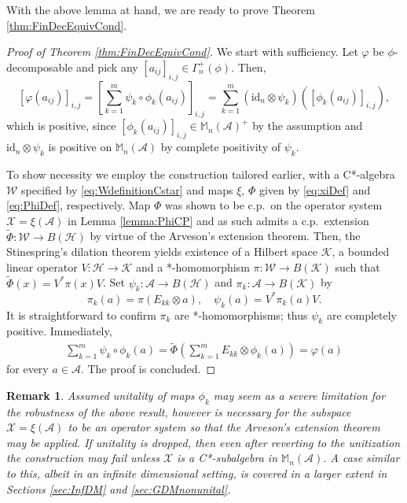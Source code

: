 \documentclass[reqno]{amsart}
\theoremstyle{plain}
\newtheorem{remark}{Remark}
\numberwithin{equation}{section}
\numberwithin{theorem}{section}
\numberwithin{lemma}{section}
\numberwithin{definition}{section}
\numberwithin{corollary}{section}
\numberwithin{remark}{section}
\newcommand{\id}[1]{\mathrm{id}_{#1}}
\newcommand{\hadj}{*}
\newcommand{\hilbert}{\mathcal{H}}
\newcommand{\matra}[2]{\mathbb{M}_{#1}(#2)}
\begin{document}
With the above lemma at hand, we are ready to prove Theorem \ref{thm:FinDecEquivCond}.

\begin{proof}[Proof of Theorem \ref{thm:FinDecEquivCond}]
We start with sufficiency. Let $\varphi$ be $\phi$-decomposable and pick any $\left[a_{ij}\right]_{i,j}\in\Gamma_{n}^{+}(\phi)$. Then,
%
\begin{equation}\label{eq:GenDecProofRight}
    \left[\varphi(a_{ij})\right]_{i,j} = \left[ \sum_{k=1}^{m} \psi_k \circ \phi_k \left(a_{ij}\right) \right]_{i,j} = \sum_{k=1}^{m} \left(\id{n}\otimes\psi_k\right)\left(\left[\phi_k (a_{ij})\right]_{i,j}\right),
\end{equation}
which is positive, since $\left[\phi_k (a_{ij})\right]_{i,j} \in \matra{n}{\mathscr{A}}^+$ by the assumption and $\id{n}\otimes\psi_k$ is positive on $\matra{n}{\mathscr{A}}$ by complete positivity of $\psi_k$.

To show necessity we employ the construction tailored earlier, with a C*-algebra $\mathscr{W}$ specified by \eqref{eq:WdefinitionCstar} and maps $\xi$, $\Phi$ given by \eqref{eq:xiDef} and \eqref{eq:PhiDef}, respectively. Map $\Phi$ was shown to be c.p.~on the operator system $\mathscr{X} = \xi(\mathscr{A})$ in Lemma \ref{lemma:PhiCP} and as such admits a c.p.~extension $\tilde{\Phi} : \mathscr{W}\to B(\hilbert)$ by virtue of the Arveson's extension theorem. Then, the Stinespring's dilation theorem \cite{Stinespring_1955} yields existence of a Hilbert space $\mathcal{K}$, a bounded linear operator $V : \hilbert\to\mathcal{K}$ and a *-homomorphism $\pi : \mathscr{W} \to B(\mathcal{K})$ such that $\tilde{\Phi}(x) = V^\hadj \pi (x) V$. Set $\psi_k : \mathscr{A}\to B(\hilbert)$ and $\pi_k : \mathscr{A}\to B(\mathcal{K})$ by
\begin{equation}\label{eq:piPsidef}
    \pi_k(a) = \pi (E_{kk}\otimes a), \quad \psi_k (a) = V^\hadj \pi_k (a) V.
\end{equation}
It is straightforward to confirm $\pi_k$ are *-homomorphisms; thus $\psi_k$ are completely positive. Immediately,
\begin{align}\label{eq:varphiSOTseries}
    \sum_{k=1}^{m} \psi_k \circ \phi_k(a) =  \tilde{\Phi}\left( \sum_{k=1}^{m}E_{kk}\otimes\phi_k(a)\right) = \varphi (a)
\end{align}
for every $a\in\mathscr{A}$. The proof is concluded.
\end{proof}

\begin{remark}
    Assumed unitality of maps $\phi_k$ may seem as a severe limitation for the robustness of the above result, however is necessary for the subspace $\mathscr{X} = \xi(\mathscr{A})$ to be an operator system so that the Arveson's extension theorem may be applied. If unitality is dropped, then even after reverting to the unitization the construction may fail unless $\mathscr{X}$ is a C*-subalgebra in $\matra{n}{\mathscr{A}}$. A case similar to this, albeit in an infinite dimensional setting, is covered in a larger extent in Sections \ref{sec:InfDM} and \ref{sec:GDMnonunital}.
\end{remark}
\end{document}
